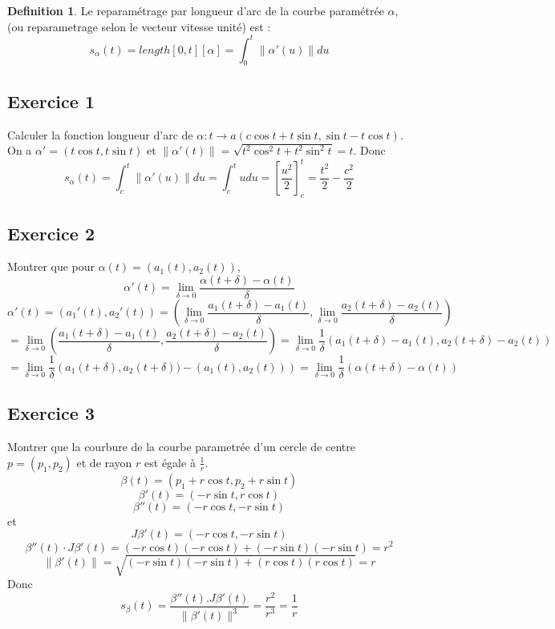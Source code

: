 \documentclass[]{book}
\theoremstyle{definition}
\newtheorem{defn}{Definition}
\begin{document}
\begin{defn}
Le reparam\'etrage par longueur d'arc de la courbe param\'etr\'ee $\alpha$, (ou reparametrage selon le vecteur vitesse unit\'e) est :
$$
s_{\alpha}(t) = length[0,t][\alpha] = \int_0^t \lVert \alpha'(u) \rVert du
$$ 
\end{defn}

\subsection*{Exercice 1}
Calculer la fonction longueur d'arc de $\alpha: t \to a(c\cos t + t\sin t, \sin t - t\cos t)$.
On a $\alpha' = (t \cos t, t \sin t)$ et $\lVert \alpha'(t) \rVert = \sqrt{t^2 \cos^2 t + t^2 \sin^2 t} = t$.
Donc
$$
s_{\alpha}(t) = \int_c^t \lVert \alpha'(u) \rVert du = \int_c^t{u du} = \left[ \frac{u^2}{2} \right]_c^t = \frac{t^2}{2} - \frac{c^2}{2}
$$ 

\subsection*{Exercice 2}
Montrer que pour $\alpha(t) = (a_1(t), a_2(t))$,
$$
\alpha'(t) = \lim_{\delta \to 0} \frac{\alpha(t+\delta) - \alpha(t)}{\delta}
$$
$$
\alpha'(t) = (a_1'(t), a_2'(t)) = (\lim_{\delta \to 0} \frac{a_1(t+\delta) - a_1(t)}{\delta}, \lim_{\delta \to 0} \frac{a_2(t+\delta) - a_2(t)}{\delta}) 
$$
$$
= \lim_{\delta \to 0} \left(\frac{a_1(t+\delta) - a_1(t)}{\delta},\frac{a_2(t+\delta) - a_2(t)}{\delta}\right) = \lim_{\delta \to 0} \frac{1}{\delta} \left(a_1(t+\delta) - a_1(t),a_2(t+\delta) - a_2(t)\right)
$$
$$
= \lim_{\delta \to 0} \frac{1}{\delta} \left(a_1(t+\delta),a_2(t+\delta)) - (a_1(t),a_2(t)) \right) = \lim_{\delta \to 0} \frac{1}{\delta} \left(\alpha(t+\delta) - \alpha(t) \right)
$$

\subsection*{Exercice 3}
Montrer que la courbure de la courbe parametr\'ee d'un cercle de centre $p = (p_1, p_2)$ et de rayon $r$ est \'egale \`a $\frac{1}{r}$.
$$\beta(t) = (p_1 + r\cos t, p_2 + r\sin t)$$
$$\beta'(t) = (-r\sin t, r\cos t)$$
$$\beta''(t) = (-r\cos t, -r\sin t)$$
et
$$J\beta'(t) = (-r\cos t, -r\sin t)$$
$$\beta''(t) \cdot J\beta'(t) = (-r \cos t)(-r \cos t) + (-r \sin t)(-r \sin t) = r^2$$
$$\lVert \beta'(t) \rVert = \sqrt{(-r \sin t)(-r \sin t) + (r \cos t)(r \cos t)} = r$$
Donc
$$
s_{\beta}(t) = \frac{\beta''(t).J\beta'(t)}{\lVert \beta'(t) \rVert^3} = \frac{r^2}{r^3} = \frac{1}{r}
$$ 
\end{document}
